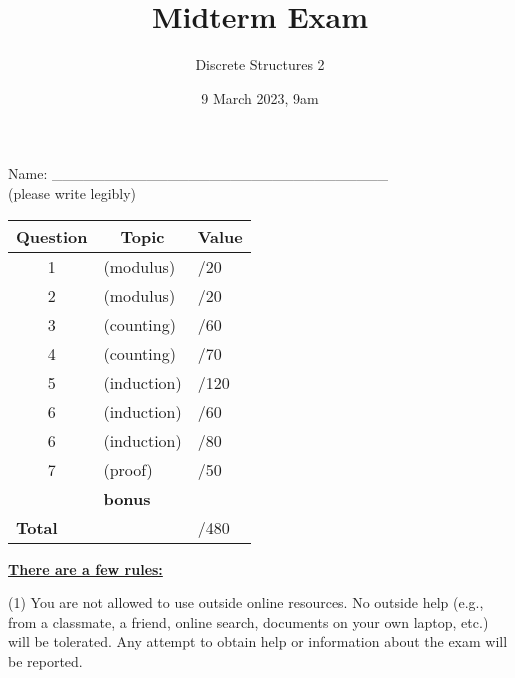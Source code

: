 \documentclass[11pt, oneside]{article}   	%
\title{Midterm Exam}
\author{Discrete Structures 2}
\date{9 March 2023, 9am}							%
\begin{document}
\maketitle
\begin{center}
Name: \_\_\_\_\_\_\_\_\_\_\_\_\_\_\_\_\_\_\_\_\_\_\_\_\_\_\_\_\_\_\_\_ \\(please write legibly) 
\end{center}

\begin{center}
\begin{tabular}{|c|l|l|}
\hline
\textbf{Question} & \multicolumn{1}{|c|}{\textbf{Topic}} & \multicolumn{1}{|c|}{\textbf{Value}}\\
\hline
\hline
1 & (modulus) & \hspace{3em}/20\\ \hline
2 & (modulus) & \hspace{3em}/20\\ \hline
3 & (counting) & \hspace{3em}/60\\ \hline
4 & (counting) & \hspace{3em}/70\\ \hline
5 & (induction) &  \hspace{3em}/120\\ \hline
6 & (induction) & \hspace{3em}/60\\ \hline
6 & (induction) & \hspace{3em}/80\\ \hline
7 & (proof) & \hspace{3em}/50\\ \hline
 & \textbf{bonus} &\\ \hline
 \hline
\hline
\multicolumn{2}{|l|}{\textbf{Total}} & \hspace{4em}/480\\
\hline
\end{tabular}
\end{center}


\textbf{\underline{There are a few rules:}}

(1) You are not allowed to use outside online resources. 
No outside help (e.g., from a classmate, a friend, online search, documents on your own laptop, etc.) will be tolerated. 
Any attempt to obtain help or information about the exam will be reported.
\end{document}
